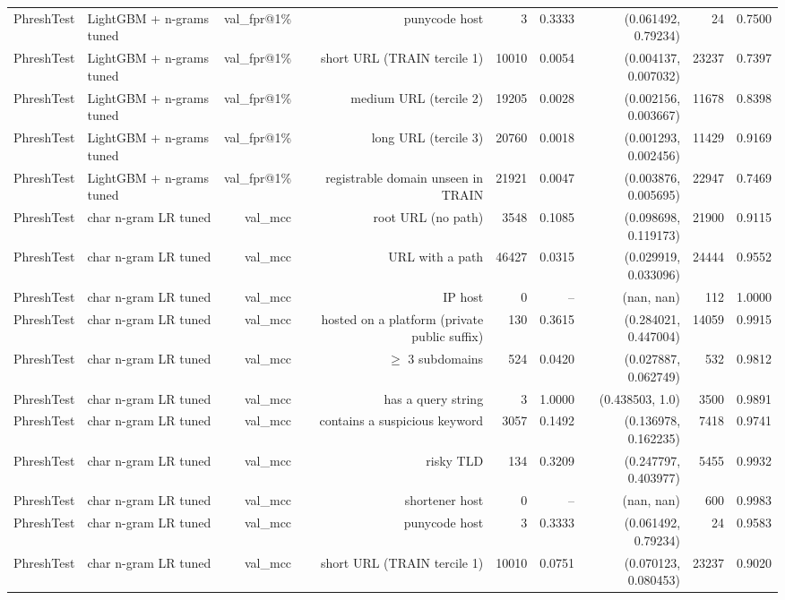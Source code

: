\begin{table}[t]
\begin{tabular}{llrrrrrrr}
PhreshTest & LightGBM + n-grams tuned & val\_fpr@1\% & punycode host & 3 & 0.3333 & (0.061492, 0.79234) & 24 & 0.7500 \\
PhreshTest & LightGBM + n-grams tuned & val\_fpr@1\% & short URL (TRAIN tercile 1) & 10010 & 0.0054 & (0.004137, 0.007032) & 23237 & 0.7397 \\
PhreshTest & LightGBM + n-grams tuned & val\_fpr@1\% & medium URL (tercile 2) & 19205 & 0.0028 & (0.002156, 0.003667) & 11678 & 0.8398 \\
PhreshTest & LightGBM + n-grams tuned & val\_fpr@1\% & long URL (tercile 3) & 20760 & 0.0018 & (0.001293, 0.002456) & 11429 & 0.9169 \\
PhreshTest & LightGBM + n-grams tuned & val\_fpr@1\% & registrable domain unseen in TRAIN & 21921 & 0.0047 & (0.003876, 0.005695) & 22947 & 0.7469 \\
PhreshTest & char n-gram LR tuned & val\_mcc & root URL (no path) & 3548 & 0.1085 & (0.098698, 0.119173) & 21900 & 0.9115 \\
PhreshTest & char n-gram LR tuned & val\_mcc & URL with a path & 46427 & 0.0315 & (0.029919, 0.033096) & 24444 & 0.9552 \\
PhreshTest & char n-gram LR tuned & val\_mcc & IP host & 0 & -- & (nan, nan) & 112 & 1.0000 \\
PhreshTest & char n-gram LR tuned & val\_mcc & hosted on a platform (private public suffix) & 130 & 0.3615 & (0.284021, 0.447004) & 14059 & 0.9915 \\
PhreshTest & char n-gram LR tuned & val\_mcc & $\geq$ 3 subdomains & 524 & 0.0420 & (0.027887, 0.062749) & 532 & 0.9812 \\
PhreshTest & char n-gram LR tuned & val\_mcc & has a query string & 3 & 1.0000 & (0.438503, 1.0) & 3500 & 0.9891 \\
PhreshTest & char n-gram LR tuned & val\_mcc & contains a suspicious keyword & 3057 & 0.1492 & (0.136978, 0.162235) & 7418 & 0.9741 \\
PhreshTest & char n-gram LR tuned & val\_mcc & risky TLD & 134 & 0.3209 & (0.247797, 0.403977) & 5455 & 0.9932 \\
PhreshTest & char n-gram LR tuned & val\_mcc & shortener host & 0 & -- & (nan, nan) & 600 & 0.9983 \\
PhreshTest & char n-gram LR tuned & val\_mcc & punycode host & 3 & 0.3333 & (0.061492, 0.79234) & 24 & 0.9583 \\
PhreshTest & char n-gram LR tuned & val\_mcc & short URL (TRAIN tercile 1) & 10010 & 0.0751 & (0.070123, 0.080453) & 23237 & 0.9020 \\

\end{tabular}
\end{table}
